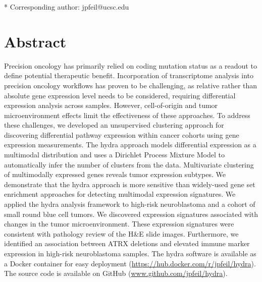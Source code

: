 \documentclass[10pt,letterpaper]{article}
\begin{document}
\begin{flushleft}
% 
%





* Corresponding author: jpfeil@ucsc.edu

\end{flushleft}
\section*{Abstract}
Precision oncology has primarily relied on coding mutation status as a readout to define potential therapeutic benefit. Incorporation of transcriptome analysis into precision oncology workflows has proven to be challenging, as relative rather than absolute gene expression level needs to be considered, requiring differential expression analysis across samples. However, cell-of-origin and tumor microenvironment effects limit the effectiveness of these approaches. To address these challenges, we developed an unsupervised clustering approach for discovering differential pathway expression within cancer cohorts using gene expression measurements. The hydra approach models differential expression as a multimodal distribution and uses a Dirichlet Process Mixture Model to automatically infer the number of clusters from the data. Multivariate clustering of multimodally expressed genes reveals tumor expression subtypes. We demonstrate that the hydra approach is more sensitive than widely-used gene set enrichment approaches for detecting multimodal expression signatures. We applied the hydra analysis framework to high-risk neuroblastoma and a cohort of small round blue cell tumors. We discovered expression signatures associated with changes in the tumor microenvironment. These expression signatures were consistent with pathology review of the H\&E slide images. Furthermore, we identified an association between ATRX deletions and elevated immune marker expression in high-risk neuroblastoma samples. The hydra software is available as a Docker container for easy deployment (\url{https://hub.docker.com/r/jpfeil/hydra}). The source code is available on GitHub (\url{www.github.com/jpfeil/hydra}).
\end{document}
